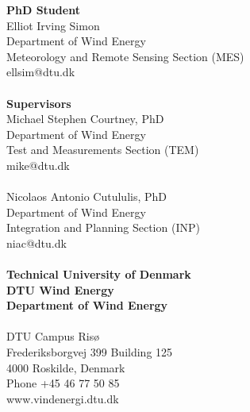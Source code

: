 \thispagestyle{empty} %
\frieze
\vspace*{\fill}
\noindent
\sffamily
\small
\textbf{PhD Student}\\
Elliot Irving Simon\\
Department of Wind Energy\\
Meteorology and Remote Sensing Section (MES)\\
ellsim@dtu.dk\\
\\
\textbf{Supervisors}\\
Michael Stephen Courtney, PhD\\
Department of Wind Energy\\
Test and Measurements Section (TEM)\\
mike@dtu.dk\\
\\
Nicolaos Antonio Cutululis, PhD\\
Department of Wind Energy\\
Integration and Planning Section (INP)\\
niac@dtu.dk\\
\\
\textbf{Technical University of Denmark}\\
\textbf{DTU Wind Energy}\\
\textbf{Department of Wind Energy}\\
\\
DTU Campus Ris{\o}\\
Frederiksborgvej 399
Building 125\\
4000 Roskilde, Denmark\\
Phone +45 46 77 50 85\\
www.vindenergi.dtu.dk\\
\normalsize
\normalfont
\vspace*{2.5cm}